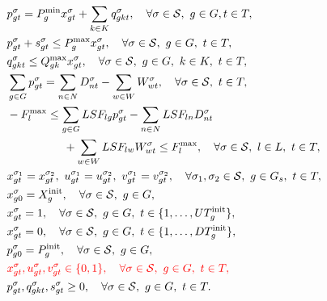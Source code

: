 \begin{subequations}
\begin{align}
	& p_{gt}^\sigma = P^\text{min}_g x_{gt}^\sigma + \sum_{k\in K} q_{gkt}^\sigma, \quad \forall \sigma \in \mathcal{S},\ g\in G, t\in T,\ \label{sucw:j} \\
	& p_{gt}^\sigma + s_{gt}^\sigma \leq P^\text{max}_g x_{gt}^\sigma, \quad \forall \sigma \in \mathcal{S},\ g\in G,\ t\in T, \label{sucw:k} \\
	& q_{gkt}^\sigma \leq Q^\text{max}_{gk} x_{gt}^\sigma, \quad \forall \sigma \in \mathcal{S},\ g\in G,\ k\in K,\ t\in T, \label{sucw:l} \\
	& \sum_{g\in G} p_{gt}^\sigma = \sum_{n\in N} D_{nt}^\sigma - \sum_{w\in W} W_{wt}^\sigma, \quad \forall \sigma \in \mathcal{S},\ t\in T,\ \label{sucw:m} \\
	& -F^\text{max}_l \leq \sum_{g\in G} LSF_{lg} p_{gt}^\sigma - \sum_{n\in N} LSF_{ln} D_{nt}^\sigma \notag	\\
	&\quad\quad\quad\quad\quad + \sum_{w\in W} LSF_{lw} W_{wt}^\sigma \leq F^\text{max}_l,\quad \forall \sigma \in \mathcal{S},\ l\in L,\ t\in T, \label{sucw:n} \\
	& x_{gt}^{\sigma_1} = x_{gt}^{\sigma_2},\ u_{gt}^{\sigma_1} = u_{gt}^{\sigma_2},\ v_{gt}^{\sigma_1} = v_{gt}^{\sigma_2},\quad \forall \sigma_1,\sigma_2 \in \mathcal{S},\ g\in G_s,\ t\in T, \label{sucw:o} \\
	& x_{g0}^\sigma = X^\text{init}_g, \quad \forall \sigma \in \mathcal{S},\ g\in G, \label{sucw:p} \\
	& x_{gt}^\sigma = 1, \quad \forall \sigma \in \mathcal{S},\ g\in G,\ t\in \{1, \dots, UT^\text{init}_g\}, \label{sucw:q} \\
	& x_{gt}^\sigma = 0, \quad \forall \sigma \in \mathcal{S},\ g\in G,\ t\in \{1, \dots, DT^\text{init}_g\}, \label{sucw:r} \\
	& p_{g0}^\sigma = P^\text{init}_g, \quad \forall \sigma \in \mathcal{S},\ g\in G,\ \label{sucw:s} \\
	& \textcolor{red}{x_{gt}^\sigma , u_{gt}^\sigma , v_{gt}^\sigma \in \{0,1\},\quad \forall \sigma \in \mathcal{S},\ g\in G,\ t\in T, }\label{sucw:t} \\
	& p_{gt}^\sigma , q_{gkt}^\sigma,s_{gt}^\sigma \geq 0, \quad \forall \sigma \in \mathcal{S},\ g\in G,\ t\in T. \label{sucw:u} 
	\end{align}
\end{subequations}
